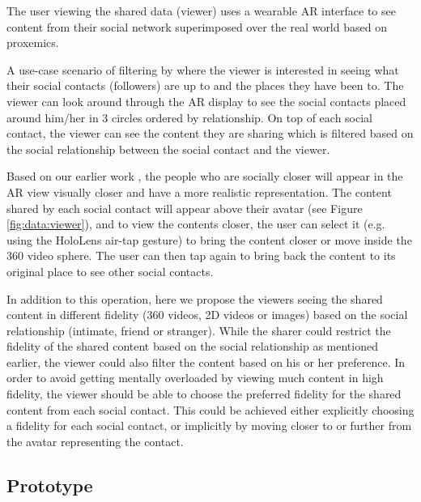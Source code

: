 The user viewing the shared data (viewer) uses a wearable AR interface to see content from their social network superimposed over the real world based on proxemics. 

A use-case scenario of filtering by where the viewer is interested in seeing what their social contacts (followers) are up to and the places they have been to. The viewer can look around through the AR display to see the social contacts placed around him/her in 3 circles ordered by relationship. On top of each social contact, the viewer can see the content they are sharing which is filtered based on the social relationship between the social contact and the viewer.

Based on our earlier work \cite{Nassani2017a}, the people who are socially closer will appear in the AR view visually closer and have a more realistic representation. The content shared by each social contact will appear above their avatar (see Figure \ref{fig:data:viewer}), and to view the contents closer, the user can select it (e.g. using the HoloLens air-tap gesture) to bring the content closer or move inside the 360 video sphere. The user can then tap again to bring back the content to its original place to see other social contacts. 

In addition to this operation, here we propose the viewers seeing the shared content in different fidelity (360 videos, 2D videos or images) based on the social relationship (intimate, friend or stranger). While the sharer could restrict the fidelity of the shared content based on the social relationship as mentioned earlier, the viewer could also filter the content based on his or her preference. In order to avoid getting mentally overloaded by viewing much content in high fidelity, the viewer should be able to choose the preferred fidelity for the shared content from each social contact. This could be achieved either explicitly choosing a fidelity for each social contact, or implicitly by moving closer to or further from the avatar representing the contact.      

\subsection{Prototype}

